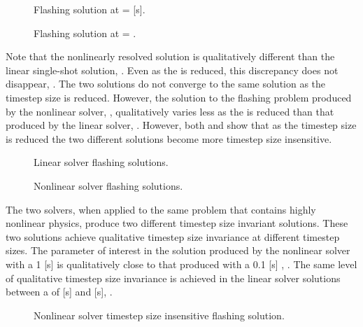 \begin{figure}[h!t]
\centering

\caption{Flashing solution at \dtmax{} =  {[s]}.}
\label{fig:flashing1pt0000em0}
\end{figure}

\begin{figure}[h!t]
\centering

\caption{Flashing solution at \dtmax{} = .}
\label{fig:flashing1pt0000em5}
\end{figure}

Note that the nonlinearly resolved solution is qualitatively different than the linear single-shot solution, .
Even as the \dtmax{} is reduced, this discrepancy does not disappear, .
The two solutions do not converge to the same solution as the timestep size is reduced.
However, the solution to the flashing problem produced by the nonlinear solver, , qualitatively varies less as the \dtmax{} is reduced than that produced by the linear solver, .
However, both  and  show that as the timestep size is reduced the two different solutions become more timestep size insensitive.

\begin{figure}[h!t]
\centering

\caption{Linear solver flashing solutions.}
\label{fig:flashingAlphaLin}
\end{figure}

\begin{figure}[h!t]
\centering

\caption{Nonlinear solver flashing solutions.}
\label{fig:flashingAlphaNln}
\end{figure}

The two solvers, when applied to the same problem that contains highly nonlinear physics, produce two different timestep size invariant solutions.
These two solutions achieve qualitative timestep size invariance at different timestep sizes.
The parameter of interest in the solution produced by the nonlinear solver with a 1 [s] \dtmax{} is qualitatively close to that produced with a 0.1 [s] \dtmax{}, .
The same level of qualitative timestep size invariance is achieved in the linear solver solutions between a \dtmax{} of  [s] and  [s], .

\begin{figure}[h!t]
\centering

\caption{Nonlinear solver timestep size insensitive flashing solution.}
\label{fig:flashingDtInsensitiveNln}
\end{figure}

